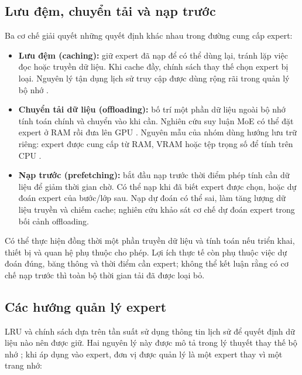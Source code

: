 \subsection{Lưu đệm, chuyển tải và nạp trước}

Ba cơ chế giải quyết những quyết định khác nhau trong đường cung cấp expert:

\begin{itemize}
\item \textbf{Lưu đệm (caching):} giữ expert đã nạp để có thể dùng lại, tránh lặp việc đọc hoặc truyền dữ liệu. Khi cache đầy, chính sách thay thế chọn expert bị loại. Nguyên lý tận dụng lịch sử truy cập được dùng rộng rãi trong quản lý bộ nhớ \cite{ostep_policies}.
\item \textbf{Chuyển tải dữ liệu (offloading):} bố trí một phần dữ liệu ngoài bộ nhớ tính toán chính và chuyển vào khi cần. Nghiên cứu suy luận MoE có thể đặt expert ở RAM rồi đưa lên GPU \cite{moe_offloading}. Nguyên mẫu của nhóm dùng hướng lưu trữ riêng: expert được cung cấp từ RAM, VRAM hoặc tệp trọng số để tính trên CPU \cite{moe_tierengine_arch}.
\item \textbf{Nạp trước (prefetching):} bắt đầu nạp trước thời điểm phép tính cần dữ liệu để giảm thời gian chờ. Có thể nạp khi đã biết expert được chọn, hoặc dự đoán expert của bước/lớp sau. Nạp dự đoán có thể sai, làm tăng lượng dữ liệu truyền và chiếm cache; nghiên cứu \cite{moe_offloading} khảo sát cơ chế dự đoán expert trong bối cảnh offloading.
\end{itemize}

Có thể thực hiện đồng thời một phần truyền dữ liệu và tính toán nếu triển khai, thiết bị và quan hệ phụ thuộc cho phép. Lợi ích thực tế còn phụ thuộc việc dự đoán đúng, băng thông và thời điểm cần expert; không thể kết luận rằng có cơ chế nạp trước thì toàn bộ thời gian tải đã được loại bỏ.

\subsection{Các hướng quản lý expert}

LRU và chính sách dựa trên tần suất sử dụng thông tin lịch sử để quyết định dữ liệu nào nên được giữ. Hai nguyên lý này được mô tả trong lý thuyết thay thế bộ nhớ \cite{ostep_policies}; khi áp dụng vào expert, đơn vị được quản lý là một expert thay vì một trang nhớ:

